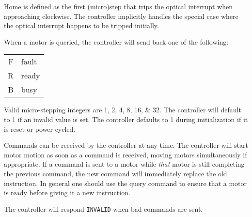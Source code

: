 \documentclass[11pt]{article}
\begin{document}
Home is defined as the first (micro)step that trips the optical interrupt when approaching clockwise. The controller implicitly handles the special case where the optical interrupt happens to be tripped initially.

When a motor is queried, the controller will send back one of the following:

\begin{center}
	\begin{tabular}{r | l}
		F & fault \\ 
		R & ready \\
		B & busy
	\end{tabular}
\end{center}

Valid micro-stepping integers are 1, 2, 4, 8, 16, \& 32. The controller will default to 1 if an invalid value is set. The controller defaults to 1 during initialization if it is reset or power-cycled.

Commands can be received by the controller at any time. The controller will start motor motion as soon as a command is received, moving motors simultaneously if appropriate. If a command is sent to a motor while \textit{that} motor is still completing the previous command, the new command will immediately replace the old instruction. In general one should use the query command to ensure that a motor is ready before giving it a new instruction.

The controller will respond \texttt{INVALID} when bad commands are sent.
\end{document}
